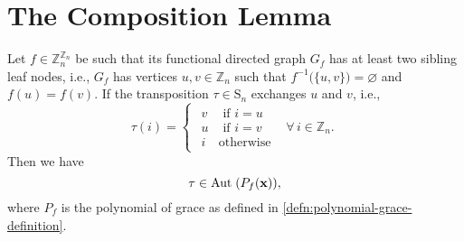 \section{The Composition Lemma}

\begin{lemma}\label{lem:transposition-invariance}
Let $f\in\mathbb{Z}_{n}^{\mathbb{Z}_{n}}$ be such that its functional directed graph $G_{f}$ has at least two sibling leaf nodes, i.e., $G_f$ has vertices $u,v\in\mathbb{Z}_{n}$ such that
$f^{-1}\big(\{u,v\}\big)=\varnothing$ and $f(u)=f(v)$. If
the transposition $\tau\in\textrm{S}_{n}$ exchanges $u$ and
$v$, i.e.,
\[
\tau(i)=\begin{cases}
\begin{array}{cc}
v & \text{ if }i=u\\
u & \text{ if }i=v\\
i & \text{otherwise}
\end{array} & \forall\,i\in\mathbb{Z}_{n}.\end{cases}
\]
Then we have 
\begin{equation}
\tau\in\text{Aut}\;(P_{f}({\bf x})),
\end{equation}
where $P_f$ is the polynomial of grace as defined in \ref{defn:polynomial-grace-definition}.
\end{lemma}
